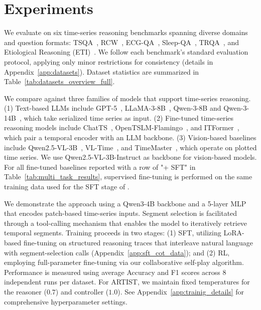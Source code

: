 \section{Experiments}

We evaluate on six time-series reasoning benchmarks spanning diverse domains and question formats: TSQA~\cite{tsqa_dataset}, RCW~\cite{rcw_dataset}, ECG-QA~\cite{ecgqa_dataset}, Sleep-QA~\cite{langer2025opentslm}, TRQA~\cite{trqa_dataset}, and Etiological Reasoning (ETI)~\cite{merrill2024tsandlang}.
We follow each benchmark’s standard evaluation protocol, applying only minor restrictions for consistency (details in Appendix~\ref{app:datasets}).
Dataset statistics are summarized in Table~\ref{tab:datasets_overview_full}.

We compare against three families of models that support time-series reasoning.
(1) Text-based LLMs include GPT-5~\cite{gpt5}, LLaMA-3-8B~\cite{llama3}, Qwen-3-8B and Qwen-3-14B~\cite{qwen3}, which take serialized time series as input.
(2) Fine-tuned time-series reasoning models include ChatTS~\cite{chatts}, OpenTSLM-Flamingo~\cite{langer2025opentslm}, and ITFormer~\cite{itformer}, which pair a temporal encoder with an LLM backbone.
(3) Vision-based baselines include Qwen2.5-VL-3B~\cite{qwenvl}, VL-Time~\cite{rcw_dataset}, and TimeMaster~\cite{zhang2025timemaster}, which operate on plotted time series. We use Qwen2.5-VL-3B-Instruct as backbone for vision-based models.
For all fine-tuned baselines reported with a row of "+ SFT" in Table~\ref{tab:multi_task_results}, supervised fine-tuning is performed on the same training data used for the SFT stage of \algoname.


We demonstrate the \algoname approach using a Qwen3-4B backbone and a 5-layer MLP that encodes patch-based time-series inputs. 
Segment selection is facilitated through a tool-calling mechanism that enables the model to iteratively retrieve temporal segments. 
Training proceeds in two stages: (1) SFT, utilizing LoRA-based fine-tuning on structured reasoning traces that interleave natural language with segment-selection calls (Appendix~\ref{app:sft_cot_data}); and (2) RL, employing full-parameter fine-tuning via our collaborative self-play algorithm.
Performance is measured using average Accuracy and F1 scores across 8 independent runs per dataset. For ARTIST, we maintain fixed temperatures for the reasoner ($0.7$) and controller ($1.0$). See Appendix~\ref{app:trainig_details} for comprehensive hyperparameter settings. 

